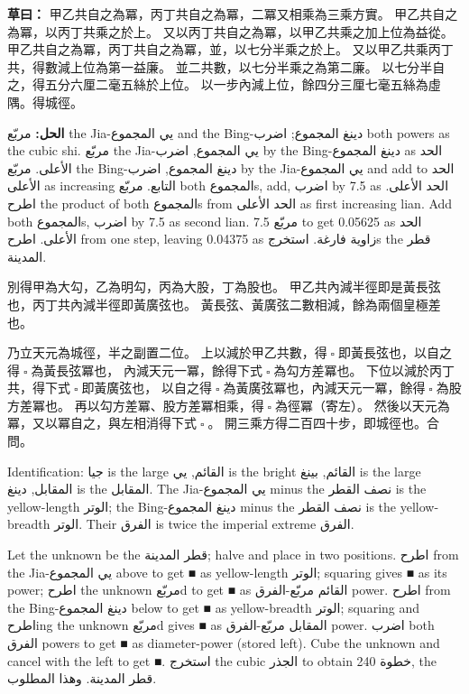 \documentclass[11pt,a4paper]{article}
\newcommand{\ChinCol}[1]{\begin{minipage}[t]{0.48\textwidth}#1\end{minipage}}
\newcommand{\ArabCol}[1]{\begin{minipage}[t]{0.48\textwidth}\arabicfont\beginR #1\endR\end{minipage}}
\newcommand{\parallelsection}[2]{%
  \noindent\ChinCol{#1}\hfill\ArabCol{#2}\par\vspace{0.5cm}%
}
\newcommand{\working}[2]{\par\noindent%
  \begin{minipage}[t]{0.48\textwidth}\textbf{草曰：}#1\end{minipage}%
  \hfill%
  \begin{minipage}[t]{0.48\textwidth}\arabicfont\beginR\textbf{الحل:} #2\endR\end{minipage}\par\vspace{0.2cm}}
\begin{document}
\working{%
甲乙共自之為冪，丙丁共自之為冪，二冪又相乘為三乘方實。
甲乙共自之為冪，以丙丁共乘之於上。
又以丙丁共自之為冪，以甲乙共乘之加上位為益從。
甲乙共自之為冪，丙丁共自之為冪，並，以七分半乘之於上。
又以甲乙共乘丙丁共，得數減上位為第一益廉。
並二共數，以七分半乘之為第二廉。
以七分半自之，得五分六厘二毫五絲於上位。
以一步內減上位，餘四分三厘七毫五絲為虛隅。得城徑。}{%
مربّع the Jia-يي المجموع and the Bing-دينغ المجموع; اضرب both powers as the cubic shi. مربّع the Jia-يي المجموع, اضرب by the Bing-دينغ المجموع as الحد الأعلى. مربّع the Bing-دينغ المجموع, اضرب by the Jia-يي المجموع and add to الحد الأعلى as increasing التابع. مربّع both المجموعs, add, اضرب by 7.5 as الحد الأعلى. اطرح the product of both المجموعs from الحد الأعلى as first increasing lian. Add both المجموعs, اضرب by 7.5 as second lian. مربّع 7.5 to get 0.05625 as الحد الأعلى. اطرح from one step, leaving 0.04375 as زاوية فارغة. استخرجs the قطر المدينة.}

\parallelsection{%
別得甲為大勾，乙為明勾，丙為大股，丁為股也。
甲乙共內減半徑即是黃長弦也，丙丁共內減半徑即黃廣弦也。
黃長弦、黃廣弦二數相減，餘為兩個皇極差也。

乃立天元為城徑，半之副置二位。
上以減於甲乙共數，得$ \; \square \; $即黃長弦也，以自之得$ \; \square \; $為黃長弦冪也，
內減天元一冪，餘得下式$ \; \square \; $為勾方差冪也。
下位以減於丙丁共，得下式$ \; \square \; $即黃廣弦也，
以自之得$ \; \square \; $為黃廣弦冪也，內減天元一冪，餘得$ \; \square \; $為股方差冪也。
再以勾方差冪、股方差冪相乘，得$ \; \square \; $為徑冪（寄左）。
然後以天元為冪，又以冪自之，與左相消得下式$ \; \square \; $。
開三乘方得二百四十步，即城徑也。合問。}{%
Identification: جيا is the large القائم, يي is the bright القائم, بينغ is the large المقابل, دينغ is the المقابل. The Jia-يي المجموع minus the نصف القطر is the yellow-length الوتر; the Bing-دينغ المجموع minus the نصف القطر is the yellow-breadth الوتر. Their الفرق is twice the imperial extreme الفرق.

Let the unknown be the قطر المدينة; halve and place in two positions. اطرح from the Jia-يي المجموع above to get ■ as yellow-length الوتر; squaring gives ■ as its power; اطرح the unknown مربّعd to get ■ as القائم مربّع-الفرق power. اطرح from the Bing-دينغ المجموع below to get ■ as yellow-breadth الوتر; squaring and اطرحing the unknown مربّعd gives ■ as المقابل مربّع-الفرق power. اضرب both الفرق powers to get ■ as diameter-power (stored left). Cube the unknown and cancel with the left to get ■. استخرج the cubic الجذر to obtain 240 خطوة, the قطر المدينة. وهذا المطلوب.}
\end{document}
